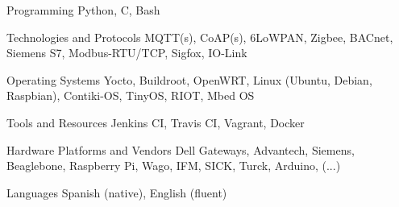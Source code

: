 

\begin{cvskills}

  \cvskill
    {Programming} %
    {Python, C, Bash} %

  \cvskill
    {Technologies and Protocols} %
    {MQTT(s), CoAP(s), 6LoWPAN, Zigbee, BACnet, Siemens S7, Modbus-RTU/TCP, Sigfox, IO-Link} %

  \cvskill
    {Operating Systems} %
    {Yocto, Buildroot, OpenWRT, Linux (Ubuntu, Debian, Raspbian), Contiki-OS, TinyOS, RIOT, Mbed OS} %

  \cvskill
    {Tools and Resources} %
    {Jenkins CI, Travis CI, Vagrant, Docker} %

  \cvskill
    {Hardware Platforms and Vendors} %
    {Dell Gateways, Advantech, Siemens, Beaglebone, Raspberry Pi, Wago, IFM, SICK, Turck, Arduino, (...)} %

  \cvskill
    {Languages} %
    {Spanish (native), English (fluent)} %

\end{cvskills}
